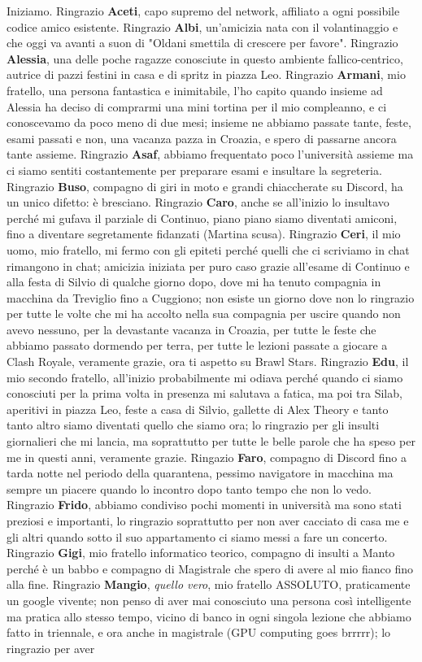 \noindent Iniziamo. Ringrazio \textbf{Aceti}, capo supremo del network, affiliato a ogni possibile codice amico esistente. Ringrazio \textbf{Albi}, un'amicizia nata con il volantinaggio e che oggi va avanti a suon di "Oldani smettila di crescere per favore". Ringrazio \textbf{Alessia}, una delle poche ragazze conosciute in questo ambiente fallico-centrico, autrice di pazzi festini in casa e di spritz in piazza Leo. Ringrazio \textbf{Armani}, mio fratello, una persona fantastica e inimitabile, l'ho capito quando insieme ad Alessia ha deciso di comprarmi una mini tortina per il mio compleanno, e ci conoscevamo da poco meno di due mesi; insieme ne abbiamo passate tante, feste, esami passati e non, una vacanza pazza in Croazia, e spero di passarne ancora tante assieme. Ringrazio \textbf{Asaf}, abbiamo frequentato poco l'università assieme ma ci siamo sentiti costantemente per preparare esami e insultare la segreteria. Ringrazio \textbf{Buso}, compagno di giri in moto e grandi chiaccherate su Discord, ha un unico difetto: è bresciano. Ringrazio \textbf{Caro}, anche se all'inizio lo insultavo perché mi gufava il parziale di Continuo, piano piano siamo diventati amiconi, fino a diventare segretamente fidanzati (Martina scusa). Ringrazio \textbf{Ceri}, il mio uomo, mio fratello, mi fermo con gli epiteti perché quelli che ci scriviamo in chat rimangono in chat; amicizia iniziata per puro caso grazie all'esame di Continuo e alla festa di Silvio di qualche giorno dopo, dove mi ha tenuto compagnia in macchina da Treviglio fino a Cuggiono; non esiste un giorno dove non lo ringrazio per tutte le volte che mi ha accolto nella sua compagnia per uscire quando non avevo nessuno, per la devastante vacanza in Croazia, per tutte le feste che abbiamo passato dormendo per terra, per tutte le lezioni passate a giocare a Clash Royale, veramente grazie, ora ti aspetto su Brawl Stars. Ringrazio \textbf{Edu}, il mio secondo fratello, all'inizio probabilmente mi odiava perché quando ci siamo conosciuti per la prima volta in presenza mi salutava a fatica, ma poi tra Silab, aperitivi in piazza Leo, feste a casa di Silvio, gallette di Alex Theory e tanto tanto altro siamo diventati quello che siamo ora; lo ringrazio per gli insulti giornalieri che mi lancia, ma soprattutto per tutte le belle parole che ha speso per me in questi anni, veramente grazie. Ringazio \textbf{Faro}, compagno di Discord fino a tarda notte nel periodo della quarantena, pessimo navigatore in macchina ma sempre un piacere quando lo incontro dopo tanto tempo che non lo vedo. Ringrazio \textbf{Frido}, abbiamo condiviso pochi momenti in università ma sono stati preziosi e importanti, lo ringrazio soprattutto per non aver cacciato di casa me e gli altri quando sotto il suo appartamento ci siamo messi a fare un concerto. Ringrazio \textbf{Gigi}, mio fratello informatico teorico, compagno di insulti a Manto perché è un babbo e compagno di Magistrale che spero di avere al mio fianco fino alla fine. Ringrazio \textbf{Mangio}, \textit{quello vero}, mio fratello ASSOLUTO, praticamente un google vivente; non penso di aver mai conosciuto una persona così intelligente ma pratica allo stesso tempo, vicino di banco in ogni singola lezione che abbiamo fatto in triennale, e ora anche in magistrale (GPU computing goes brrrrr); lo ringrazio per aver 